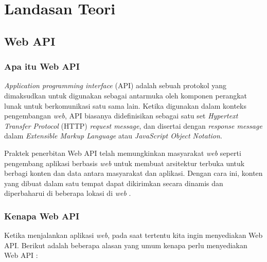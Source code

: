 \documentclass[a4paper, 12pt, oneside]{report}
\begin{document}
\chapter{Landasan Teori}

\section{Web API}
\onehalfspacing
\subsection{Apa itu Web API}

\onehalfspacing \textit{Application programming interface} (API) adalah sebuah protokol yang dimaksudkan untuk digunakan sebagai antarmuka oleh komponen perangkat lunak untuk berkomunikasi satu sama lain. Ketika digunakan dalam konteks pengembangan \textit{web}, API biasanya didefinisikan sebagai satu set \textit{Hypertext Transfer Protocol} (HTTP) \textit{request message}, dan disertai dengan \textit{response message} dalam \textit{Extensible Markup Language} atau \textit{JavaScript Object Notation}.

\onehalfspacing Praktek penerbitan Web API telah memungkinkan masyarakat \textit{web} seperti \newline pengembang aplikasi berbasis \textit{web} untuk membuat arsitektur terbuka untuk berbagi konten dan data antara masyarakat dan aplikasi. Dengan cara ini, konten yang dibuat dalam satu tempat dapat dikirimkan secara dinamis dan diperbaharui di beberapa lokasi di \textit{web} \cite{api-wikipedia}.

\subsection{Kenapa Web API}
Ketika menjalankan aplikasi \textit{web}, pada saat tertentu kita ingin menyediakan Web API. Berikut adalah beberapa alasan yang umum kenapa perlu menyediakan Web API \cite{apis-linux-journal}:
\end{document}
